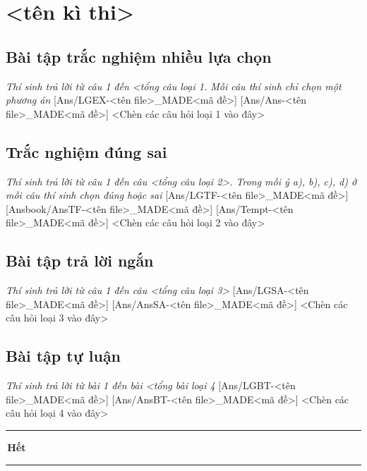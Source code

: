 \documentclass[FileMain.tex]{subfiles}
\gdef\made{<mã đề ngẫu nhiên>}  %
\begin{document}
\section[<tên kì thi> <môn thi> - Mã đề \made]{<tên kì thi>} %

\subsection{Bài tập trắc nghiệm nhiều lựa chọn}\textit{\large Thí sinh trả lời từ câu 1 đến <tổng câu loại 1. Mỗi câu thí sinh chỉ chọn một phương án}
[Ans/LGEX-<tên file>_MADE<mã đề>]
[Ans/Ans-<tên file>_MADE<mã đề>]
  <Chèn các câu hỏi loại 1 vào đây>

\subsection{Trắc nghiệm đúng sai}\textit{\large Thí sinh trả lời từ câu 1 đến câu <tổng câu loại 2>. Trong mỗi ý a), b), c), d) ở mỗi câu thí sinh chọn đúng hoặc sai}
[Ans/LGTF-<tên file>_MADE<mã đề>]
[Ansbook/AnsTF-<tên file>_MADE<mã đề>]
[Ans/Tempt-<tên file>_MADE<mã đề>]
\setcounter{ex}{0}
	<Chèn các câu hỏi loại 2 vào đây>

\subsection{Bài tập trả lời ngắn}\textit{\large Thí sinh trả lời từ câu 1 đến câu <tổng câu loại 3>}
[Ans/LGSA-<tên file>_MADE<mã đề>]
[Ans/AnsSA-<tên file>_MADE<mã đề>]
\setcounter{ex}{0}
	<Chèn các câu hỏi loại 3 vào đây>



\subsection{Bài tập tự luận}\textit{\large Thí sinh trả lời từ bài 1 đến bài <tổng bài loại 4}
[Ans/LGBT-<tên file>_MADE<mã đề>]
[Ans/AnsBT-<tên file>_MADE<mã đề>]
	<Chèn các câu hỏi loại 4 vào đây>

\begin{center}
 \rule[4pt]{2cm}{1pt}\,\large\bfseries Hết\,\rule[4pt]{2cm}{1pt}
\end{center}
\label{x}
\end{document}
